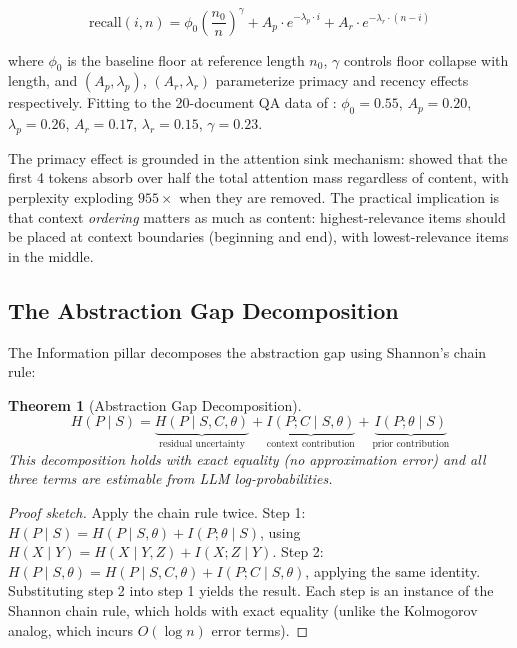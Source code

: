 \documentclass[11pt, a4paper, logo, copyright]{googledeepmind}
\newtheorem{theorem}{Theorem}[section]
\begin{document}
\begin{equation}
    \text{recall}(i, n) = \phi_0 \left(\frac{n_0}{n}\right)^{\!\gamma} + A_p \cdot e^{-\lambda_p \cdot i} + A_r \cdot e^{-\lambda_r \cdot (n - i)}
\end{equation}

where $\phi_0$ is the baseline floor at reference length $n_0$, $\gamma$ controls floor collapse with length, and $(A_p, \lambda_p)$, $(A_r, \lambda_r)$ parameterize primacy and recency effects respectively. Fitting to the 20-document QA data of \citet{liu2024lost}: $\phi_0 = 0.55$, $A_p = 0.20$, $\lambda_p = 0.26$, $A_r = 0.17$, $\lambda_r = 0.15$, $\gamma = 0.23$.

The primacy effect is grounded in the attention sink mechanism: \citet{xiao2024efficient} showed that the first 4 tokens absorb over half the total attention mass regardless of content, with perplexity exploding $955\times$ when they are removed. The practical implication is that context \emph{ordering} matters as much as content: highest-relevance items should be placed at context boundaries (beginning and end), with lowest-relevance items in the middle.

\subsection{The Abstraction Gap Decomposition}

The Information pillar decomposes the abstraction gap using Shannon's chain rule:

\begin{theorem}[Abstraction Gap Decomposition]
\label{thm:gap-decomposition}
\begin{equation}
    H(P \mid S) = \underbrace{H(P \mid S, C, \theta)}_{\text{residual uncertainty}} + \underbrace{I(P; C \mid S, \theta)}_{\text{context contribution}} + \underbrace{I(P; \theta \mid S)}_{\text{prior contribution}}
\end{equation}
This decomposition holds with exact equality (no approximation error) and all three terms are estimable from LLM log-probabilities.
\end{theorem}

\begin{proof}[Proof sketch]
Apply the chain rule twice. Step 1: $H(P \mid S) = H(P \mid S, \theta) + I(P; \theta \mid S)$, using $H(X \mid Y) = H(X \mid Y, Z) + I(X; Z \mid Y)$. Step 2: $H(P \mid S, \theta) = H(P \mid S, C, \theta) + I(P; C \mid S, \theta)$, applying the same identity. Substituting step 2 into step 1 yields the result. Each step is an instance of the Shannon chain rule, which holds with exact equality (unlike the Kolmogorov analog, which incurs $O(\log n)$ error terms).
\end{proof}
\end{document}
